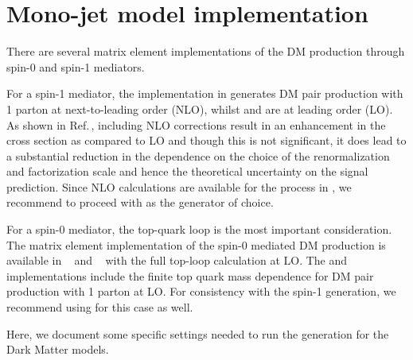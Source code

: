 \section{Mono-jet model implementation}


There are several matrix element implementations of the
DM production through spin-0 and spin-1 mediators.

For a spin-1 mediator, the implementation in \powheg generates
DM pair production with 1 parton at next-to-leading order (NLO), whilst \madgraph and \mcfm are at leading order (LO). As shown in \powheg Ref.\,\cite{Haisch:2013ata}, including NLO corrections result in an enhancement in the cross section as compared to LO and though this is not significant, it does lead to a substantial reduction in the dependence on the choice of the renormalization and factorization scale and hence the theoretical uncertainty on the signal prediction. 
Since NLO calculations are available for the process in \powheg, we recommend to proceed with \powheg as the generator of choice. 

For a spin-0 mediator, the top-quark loop is the most important
consideration.
The matrix element implementation of the \schannel spin-0 mediated DM production is available in \mcfm~\cite{Fox:2012ru,Harris:2014hga} and \powheg~\cite{Haisch:2015ioa} with the full top-loop calculation at LO.
The \powheg and \mcfm implementations include the finite
top quark mass dependence for DM pair production with 1 parton at LO.
For consistency with the spin-1 generation, we recommend using \powheg
for this case as well.

Here, we document some specific settings needed to run the \powheg 
generation for the Dark Matter models.

